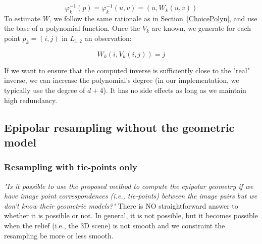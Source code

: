 \documentclass{ipol}
\newcommand{\er}[1]{\textcolor{orange}{#1}}
\begin{document}
\begin{equation}
  \varphi^{-1}_k(p) = \varphi^{-1}_k(u,v) = (u,W_k(u,v))  
\end{equation}
%
To estimate  $W$, we follow the same rationale as in Section~\ref{ChoicePolyn}, and
use the base of a polynomial function. Once the $V_k$ are known, we generate
for each point $p_k=(i,j)$ in $L_{1,2}$ an observation:

\begin{equation}
   W_k(i,V_k(i,j))  = j \label{InverseEpip}
\end{equation}

If we want to ensure that the computed inverse is sufficiently close
to the "real" inverse, we can increase the polynomial's degree (in our implementation, we typically use the degree of $d+4$). It has no side effects as long as we maintain high redundancy.



\subsection{Epipolar resampling without the geometric model}

\subsubsection{Resampling with tie-points only}

\label{EpipTieP}

\emph{"Is it possible to use
the proposed method to compute the epipolar geometry
if we have image point correspondences (i.e., tie-points) between the image pairs but we don't know their geometric models?"} There is {NO}
 straightforward answer to whether it is possible or not. In general, it is not possible,
but it becomes possible when the relief (i.e., the 3D scene) is not smooth and we constraint the resampling be more or less smooth.
%
\end{document}
